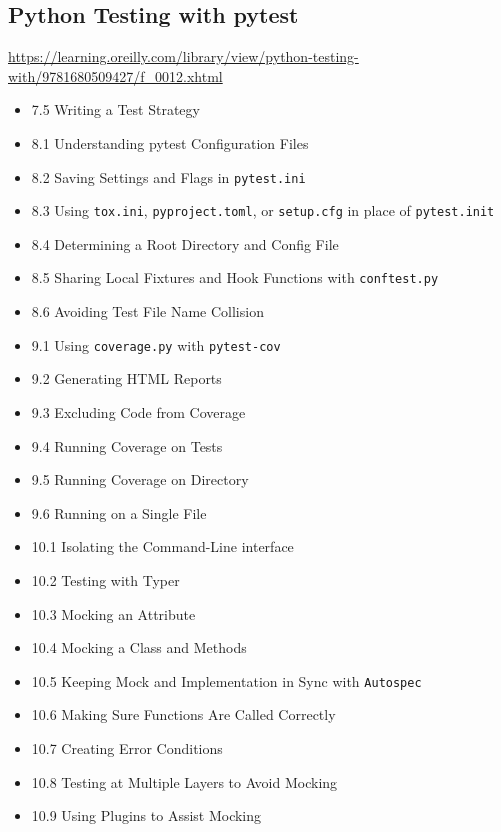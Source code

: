 \begin{mybox}
\section{Python Testing with pytest}
\label{sec:org2f60ca8}
\tcblower{}
\url{https://learning.oreilly.com/library/view/python-testing-with/9781680509427/f\_0012.xhtml}
\end{mybox}\begin{myitems}
\begin{itemize}
\item 7.5 Writing a Test Strategy
\item 8.1 Understanding pytest Configuration Files
\item 8.2 Saving Settings and Flags in \texttt{pytest.ini}
\item 8.3 Using \texttt{tox.ini}, \texttt{pyproject.toml}, or \texttt{setup.cfg} in place of \texttt{pytest.init}
\item 8.4 Determining a Root Directory and Config File
\item 8.5 Sharing Local Fixtures and Hook Functions with \texttt{conftest.py}
\item 8.6 Avoiding Test File Name Collision
\item 9.1 Using \texttt{coverage.py} with \texttt{pytest-cov}
\item 9.2 Generating HTML Reports
\item 9.3 Excluding Code from Coverage
\item 9.4 Running Coverage on Tests
\item 9.5 Running Coverage on Directory
\item 9.6 Running on a Single File
\item 10.1 Isolating the Command-Line interface
\item 10.2 Testing with Typer
\item 10.3 Mocking an Attribute
\item 10.4 Mocking a Class and Methods
\item 10.5 Keeping Mock and Implementation in Sync with \texttt{Autospec}
\item 10.6 Making Sure Functions Are Called Correctly
\item 10.7 Creating Error Conditions
\item 10.8 Testing at Multiple Layers to Avoid Mocking
\item 10.9 Using Plugins to Assist Mocking
\end{itemize}


\end{myitems}
